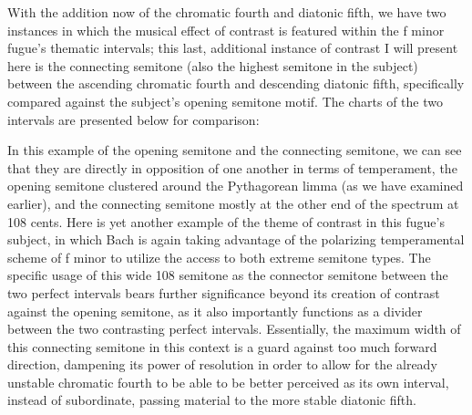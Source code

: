 With the addition now of the chromatic fourth and diatonic fifth, we
have two instances in which the musical effect of contrast is featured
within the f minor fugue's thematic intervals; this last, additional
instance of contrast I will present here is the connecting semitone
(also the highest semitone in the subject) between the ascending
chromatic fourth and descending diatonic fifth, specifically compared
against the subject's opening semitone motif. The charts of the two
intervals are presented below for comparison:


    \begin{center}
    \end{center}
    
    In this example of the opening semitone and the connecting semitone, we
can see that they are directly in opposition of one another in terms of
temperament, the opening semitone clustered around the Pythagorean limma
(as we have examined earlier), and the connecting semitone mostly at the
other end of the spectrum at 108 cents. Here is yet another example of
the theme of contrast in this fugue's subject, in which Bach is again
taking advantage of the polarizing temperamental scheme of f minor to
utilize the access to both extreme semitone types. The specific usage of
this wide 108 semitone as the connector semitone between the two perfect
intervals bears further significance beyond its creation of contrast
against the opening semitone, as it also importantly functions as a
divider between the two contrasting perfect intervals. Essentially, the
maximum width of this connecting semitone in this context is a guard
against too much forward direction, dampening its power of resolution in
order to allow for the already unstable chromatic fourth to be able to
be better perceived as its own interval, instead of subordinate, passing
material to the more stable diatonic fifth.

